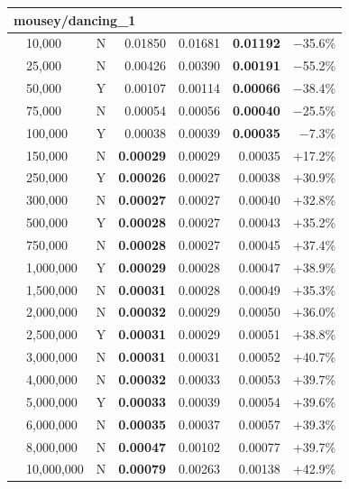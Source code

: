 \documentclass[9pt]{article}
\begin{document}
\begin{longtable}{llr|rrr|r}
\multicolumn{7}{l}{\textbf{mousey/dancing\_1}} \\
\midrule
 & 10,000 & N & 0.01850 & 0.01681 & \textbf{0.01192} & $-$35.6\% \\
 & 25,000 & N & 0.00426 & 0.00390 & \textbf{0.00191} & $-$55.2\% \\
 & 50,000 & Y & 0.00107 & 0.00114 & \textbf{0.00066} & $-$38.4\% \\
 & 75,000 & N & 0.00054 & 0.00056 & \textbf{0.00040} & $-$25.5\% \\
 & 100,000 & Y & 0.00038 & 0.00039 & \textbf{0.00035} & $-$7.3\% \\
\rowcolor{win} & 150,000 & N & \textbf{0.00029} & 0.00029 & 0.00035 & +17.2\% \\
\rowcolor{win} & 250,000 & Y & \textbf{0.00026} & 0.00027 & 0.00038 & +30.9\% \\
\rowcolor{win} & 300,000 & N & \textbf{0.00027} & 0.00027 & 0.00040 & +32.8\% \\
\rowcolor{win} & 500,000 & Y & \textbf{0.00028} & 0.00027 & 0.00043 & +35.2\% \\
\rowcolor{win} & 750,000 & N & \textbf{0.00028} & 0.00027 & 0.00045 & +37.4\% \\
\rowcolor{win} & 1,000,000 & Y & \textbf{0.00029} & 0.00028 & 0.00047 & +38.9\% \\
\rowcolor{win} & 1,500,000 & N & \textbf{0.00031} & 0.00028 & 0.00049 & +35.3\% \\
\rowcolor{win} & 2,000,000 & N & \textbf{0.00032} & 0.00029 & 0.00050 & +36.0\% \\
\rowcolor{win} & 2,500,000 & Y & \textbf{0.00031} & 0.00029 & 0.00051 & +38.8\% \\
\rowcolor{win} & 3,000,000 & N & \textbf{0.00031} & 0.00031 & 0.00052 & +40.7\% \\
\rowcolor{win} & 4,000,000 & N & \textbf{0.00032} & 0.00033 & 0.00053 & +39.7\% \\
\rowcolor{win} & 5,000,000 & Y & \textbf{0.00033} & 0.00039 & 0.00054 & +39.6\% \\
\rowcolor{win} & 6,000,000 & N & \textbf{0.00035} & 0.00037 & 0.00057 & +39.3\% \\
\rowcolor{win} & 8,000,000 & N & \textbf{0.00047} & 0.00102 & 0.00077 & +39.7\% \\
\rowcolor{win} & 10,000,000 & N & \textbf{0.00079} & 0.00263 & 0.00138 & +42.9\% \\


\end{longtable}
\end{document}
